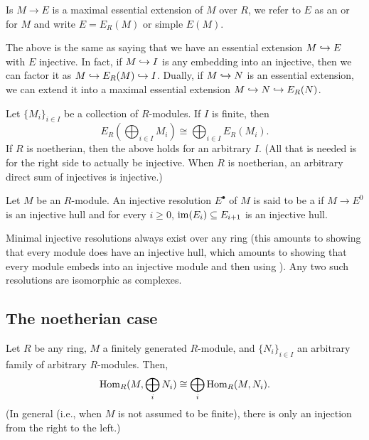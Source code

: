 \documentclass[12pt]{article}
\begin{document}
\begin{defn}
	Is $M \to E$ is a maximal essential extension of $M$ over $R$, we refer to $E$ as an  or  for $M$ and write $E = E_{R}(M)$ or simple $E(M)$.
\end{defn}
The above is the same as saying that we have an essential extension $M \hookrightarrow E$ with $E$ injective. In fact, if $M \hookrightarrow I$ is any embedding into an injective, then we can factor it as $M \hookrightarrow E_{R}(M) \hookrightarrow I$. \newline
Dually, if $M \hookrightarrow N$ is an essential extension, we can extend it into a maximal essential extension $M \hookrightarrow N \hookrightarrow E_{R}(N)$.

\begin{prop}
	Let $\{M_{i}\}_{i \in I}$ be a collection of $R$-modules. If $I$ is finite, then
	\begin{equation*} 
		E_{R}\left(\bigoplus_{i \in I} M_{i} \right) \cong \bigoplus_{i \in I} E_{R}(M_{i}).
	\end{equation*}
	If $R$ is noetherian, then the above holds for an arbitrary $I$. (All that is needed is for the right side to actually be injective. When $R$ is noetherian, an arbitrary direct sum of injectives is injective.)
\end{prop}

\begin{defn}
	Let $M$ be an $R$-module. An injective resolution $E^{\bullet}$ of $M$ is said to be a  if $M \to E^{0}$ is an injective hull and for every $i \ge 0$, $\operatorname{im}(E_{i}) \subseteq E_{i + 1}$ is an injective hull.
\end{defn}
Minimal injective resolutions always exist over any ring (this amounts to showing that every module does have an injective hull, which amounts to showing that every module embeds into an injective module and then using ). Any two such resolutions are isomorphic as complexes.

\subsection{The noetherian case}

\begin{prop}
	Let $R$ be any ring, $M$ a finitely generated $R$-module, and $\{N_{i}\}_{i \in I}$ an arbitrary family of arbitrary $R$-modules. Then,
	\begin{equation*} 
		\operatorname{Hom}_{R}(M, \bigoplus_{i} N_{i}) \cong \bigoplus_{i} \operatorname{Hom}_{R}(M, N_{i}).
	\end{equation*}
	(In general (i.e., when $M$ is not assumed to be finite), there is only an injection from the right to the left.)
\end{prop}
\end{document}

